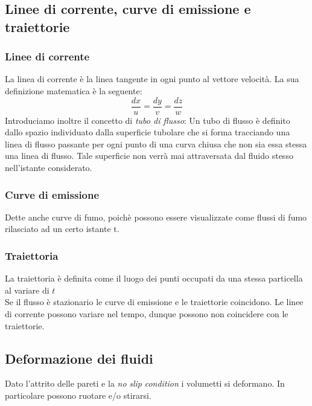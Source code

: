 \subsection{Linee di corrente, curve di emissione e traiettorie}

\subsubsection*{Linee di corrente}
La linea di corrente è la linea tangente in ogni punto al vettore velocità.
La sua definizione matematica è la seguente:
\begin{equation}
  \frac{dx}{u}=\frac{dy}{v}=\frac{dz}{w}
\end{equation}
Introduciamo inoltre il concetto di \emph{tubo di flusso}: Un tubo di flusso è definito dallo spazio individuato dalla superficie tubolare che si forma tracciando una linea di flusso passante per ogni punto di una curva chiusa che non sia essa stessa una linea di flusso. Tale superficie non verrà mai attraversata dal fluido stesso nell'istante considerato.

\subsubsection{Curve di emissione}
Dette anche curve di fumo, poichè possono essere visualizzate come flussi di fumo rilasciato ad un certo istante t.

\subsubsection{Traiettoria}
La traiettoria è definita come il luogo dei punti occupati da una stessa particella al variare di $ t $\\
Se il flusso è stazionario le curve di emissione e le traiettorie coincidono. Le linee di corrente possono variare nel tempo, dunque possono non coincidere con le traiettorie.

\subsection{Deformazione dei fluidi}
Dato l'attrito delle pareti e la \textit{no} \textit{slip} \textit{condition} i volumetti si deformano. In particolare possono ruotare e/o stirarsi.\\

